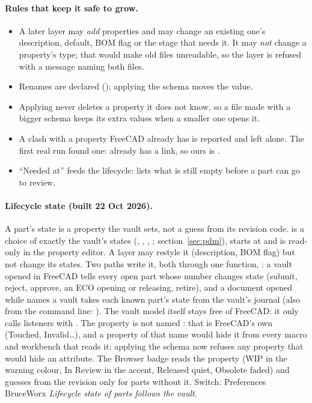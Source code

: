 \paragraph{Rules that keep it safe to grow.}
\begin{itemize}[nosep]
  \item A later layer may \emph{add} properties and may change an existing one's description, default, BOM flag
        or the stage that needs it. It may \emph{not} change a property's type; that would make old files
        unreadable, so the layer is refused with a message naming both files.
  \item Renames are declared (); applying the schema moves the value.
  \item Applying never deletes a property it does not know, so a file made with a bigger schema keeps its extra
        values when a smaller one opens it.
  \item A clash with a property FreeCAD already has is reported and left alone. The first real run found one:
         already has a  link, so ours is .
  \item ``Needed at'' feeds the lifecycle:  lists what is still empty before a part can go to review.
\end{itemize}

\paragraph{Lifecycle state (built 22 Oct 2026).} A part's state is a property the vault sets, not a guess from
its revision code.  is a choice of exactly the vault's states (, ,
, ; section~\ref{sec:pdm}), starts at  and is read-only in the property
editor. A layer may restyle it (description, BOM flag) but not change its states. Two paths write it, both through
one function, : a vault opened in FreeCAD tells every open part whose number changes
state (submit, reject, approve, an ECO opening or releasing, retire), and a document opened while
 names a vault takes each known part's state from the vault's journal (also from
the command line: ). The vault model itself stays free of FreeCAD: it
only calls listeners with . The property is not named : that is FreeCAD's own
 (Touched, Invalid\ldots), and a property of that name would hide it from every macro and
workbench that reads it; applying the schema now refuses any property that would hide an attribute. The Browser
badge reads the property (WIP in the warning colour, In Review in the accent, Released quiet, Obsolete faded) and
guesses from the revision only for parts without it. Switch: Preferences \textrightarrow{} BruceWorx \textrightarrow{}
\emph{Lifecycle state of parts follows the vault}.

